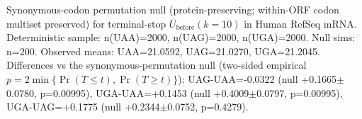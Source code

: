 Synonymous-codon permutation null (protein-preserving; within-ORF codon multiset preserved) for terminal-stop $\overline{U}_{\mathrm{before}}(k=10)$ in Human RefSeq mRNA. Deterministic sample: n(UAA)=2000, n(UAG)=2000, n(UGA)=2000. Null sims: n=200.
 Observed means: UAA=21.0592, UAG=21.0270, UGA=21.2045.
 Differences vs the synonymous-permutation null (two-sided empirical $p=2\min\{\Pr(T\le t),\Pr(T\ge t)\}$): UAG-UAA=-0.0322 (null +0.1665$\pm$0.0780, p=0.00995), UGA-UAA=+0.1453 (null +0.4009$\pm$0.0797, p=0.00995), UGA-UAG=+0.1775 (null +0.2344$\pm$0.0752, p=0.4279).
